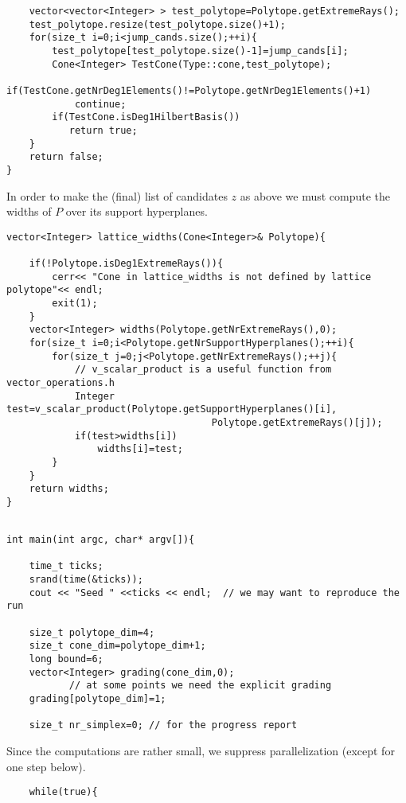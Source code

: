 \documentclass[12pt,a4paper]{scrartcl}
\theoremstyle{definition}
\begin{document}
\begin{small}
\begin{Verbatim}
    vector<vector<Integer> > test_polytope=Polytope.getExtremeRays();
    test_polytope.resize(test_polytope.size()+1); 
    for(size_t i=0;i<jump_cands.size();++i){
        test_polytope[test_polytope.size()-1]=jump_cands[i];
        Cone<Integer> TestCone(Type::cone,test_polytope);
        if(TestCone.getNrDeg1Elements()!=Polytope.getNrDeg1Elements()+1)
            continue;
        if(TestCone.isDeg1HilbertBasis())
           return true;        
    }    
    return false;    
}
\end{Verbatim}

In order to make the (final) list of candidates $z$ as above we must compute the widths of $P$ over its support hyperplanes.
\begin{Verbatim}
vector<Integer> lattice_widths(Cone<Integer>& Polytope){

    if(!Polytope.isDeg1ExtremeRays()){
        cerr<< "Cone in lattice_widths is not defined by lattice polytope"<< endl;
        exit(1);
    }
    vector<Integer> widths(Polytope.getNrExtremeRays(),0);
    for(size_t i=0;i<Polytope.getNrSupportHyperplanes();++i){
        for(size_t j=0;j<Polytope.getNrExtremeRays();++j){
            // v_scalar_product is a useful function from vector_operations.h
            Integer test=v_scalar_product(Polytope.getSupportHyperplanes()[i],
                                    Polytope.getExtremeRays()[j]);
            if(test>widths[i])
                widths[i]=test;
        }
    }
    return widths;    
}
\end{Verbatim}

\begin{Verbatim}

int main(int argc, char* argv[]){

    time_t ticks;
    srand(time(&ticks));
    cout << "Seed " <<ticks << endl;  // we may want to reproduce the run

    size_t polytope_dim=4;
    size_t cone_dim=polytope_dim+1;
    long bound=6;
    vector<Integer> grading(cone_dim,0); 
           // at some points we need the explicit grading
    grading[polytope_dim]=1;

    size_t nr_simplex=0; // for the progress report

\end{Verbatim}
Since the computations are rather small, we suppress parallelization (except for one step below).
\begin{Verbatim}	
    while(true){
    

\end{Verbatim}
\end{small}
\end{document}
